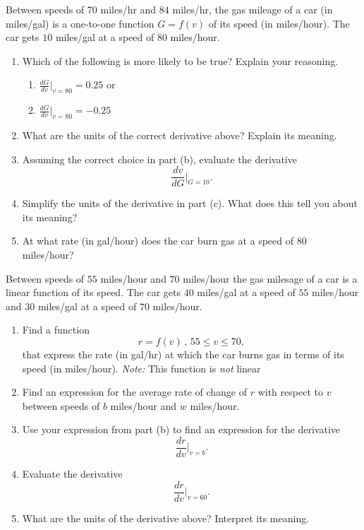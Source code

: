 \documentclass{ximera}
\begin{document}
\begin{question}
Between speeds of $70$ miles/hr and $84$ miles/hr, the gas mileage of a car (in miles/gal) is a one-to-one function $G=f(v)$ of its speed (in miles/hour). The car gets $10$ miles/gal at a speed of $80$ miles/hour.

\begin{enumerate}
\item Which of the following is more likely to be true? Explain your reasoning.

\begin{enumerate}
\item $\frac{dG}{dv}\Big|_{v=80} = 0.25$ or
\item $\frac{dG}{dv}\Big|_{v=80} = -0.25$
\end{enumerate}

\item What are the units of the correct derivative above? Explain its meaning.

\item Assuming the correct choice in part (b), evaluate the derivative
\[
   \frac{dv}{dG}\Big|_{G=10} .
\]

\item Simplify the units of the derivative in part (c). What does this tell you about its meaning?

\item At what rate (in gal/hour) does the car burn gas at a speed of $80$ miles/hour?


\end{enumerate}
\end{question}

\begin{question} \label{Qfrre4ehgfffff}
Between speeds of $55$ miles/hour and $70$ miles/hour the gas milesage of a car is a linear function of its speed. The car gets $40$ miles/gal at a speed of $55$ miles/hour and $30$ miles/gal at a speed of $70$ miles/hour.

\begin{enumerate}
\item Find a function 
\[
     r = f(v) \, , \, 55\leq v \leq 70,
\]
that express the rate (in gal/hr) at which the car burns gas in terms of its speed (in miles/hour). \emph{Note:} This function is \emph{not} linear

\item Find an expression for the average rate of change of $r$ with respect to $v$ between speeds of $b$ miles/hour and $w$ miles/hour.

\item Use your expression from part (b) to find an expression for the derivative
\[
  \frac{dr}{dv}\Big|_{v=b} .
\]

\item Evaluate the derivative
\[
  \frac{dr}{dv}\Big|_{v=60} .
\]

\item What are the units of the derivative above? Interpret its meaning.

\end{enumerate}



\end{question}
\end{document}
